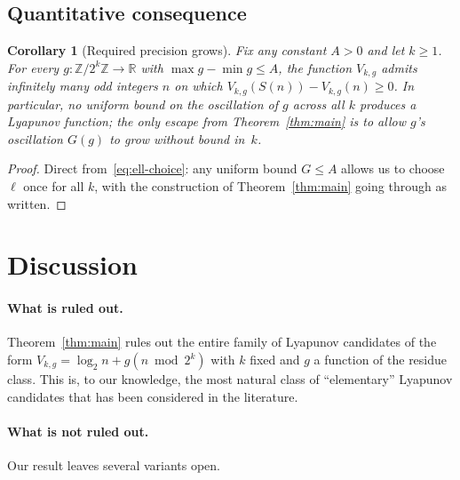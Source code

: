 \documentclass[11pt,a4paper]{article}
\newtheorem{corollary}[theorem]{Corollary}
\theoremstyle{definition}
\theoremstyle{remark}
\newcommand{\Z}{\mathbb{Z}}
\newcommand{\R}{\mathbb{R}}
\begin{document}
\subsection{Quantitative consequence}

\begin{corollary}[Required precision grows]\label{cor:precision}
Fix any constant $A > 0$ and let $k \geq 1$.  For every $g \colon
\Z / 2^k \Z \to \R$ with $\max g - \min g \leq A$, the function
$V_{k, g}$ admits infinitely many odd integers $n$ on which
$V_{k, g}(S(n)) - V_{k, g}(n) \geq 0$.  In particular, no uniform bound
on the oscillation of $g$ across all $k$ produces a Lyapunov function;
the only escape from Theorem~\ref{thm:main} is to allow $g$'s
oscillation $G(g)$ to grow without bound in~$k$.
\end{corollary}

\begin{proof}
Direct from~\eqref{eq:ell-choice}: any uniform bound $G \leq A$ allows
us to choose $\ell$ once for all $k$, with the construction of
Theorem~\ref{thm:main} going through as written.
\end{proof}

\section{Discussion}\label{sec:disc}

\paragraph{What is ruled out.}
Theorem~\ref{thm:main} rules out the entire family of Lyapunov
candidates of the form $V_{k, g} = \log_2 n + g(n \bmod 2^k)$ with
$k$ fixed and $g$ a function of the residue class.  This is, to our
knowledge, the most natural class of ``elementary'' Lyapunov
candidates that has been considered in the literature.

\paragraph{What is not ruled out.}
Our result leaves several variants open.
\end{document}
